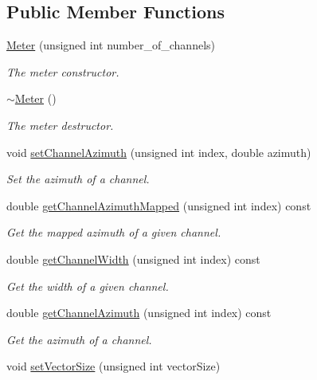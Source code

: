 \subsection*{Public Member Functions}
\begin{DoxyCompactItemize}
\item 
\hyperlink{class_hoa2_d_1_1_meter_ac2a73532fb2dc735d5c72886281b75e8}{Meter} (unsigned int number\-\_\-of\-\_\-channels)
\begin{DoxyCompactList}\small\item\em The meter constructor. \end{DoxyCompactList}\item 
\hyperlink{class_hoa2_d_1_1_meter_a48276da266f600f4d24db748ff4ca046}{$\sim$\-Meter} ()
\begin{DoxyCompactList}\small\item\em The meter destructor. \end{DoxyCompactList}\item 
void \hyperlink{class_hoa2_d_1_1_meter_a4170ee9ed709f6d6bfecd30591ac8347}{set\-Channel\-Azimuth} (unsigned int index, double azimuth)
\begin{DoxyCompactList}\small\item\em Set the azimuth of a channel. \end{DoxyCompactList}\item 
double \hyperlink{class_hoa2_d_1_1_meter_afeb35ed7f980219e9a0ef0a2b3474e42}{get\-Channel\-Azimuth\-Mapped} (unsigned int index) const 
\begin{DoxyCompactList}\small\item\em Get the mapped azimuth of a given channel. \end{DoxyCompactList}\item 
double \hyperlink{class_hoa2_d_1_1_meter_a10ccf98fe02151155c22644e7a61450a}{get\-Channel\-Width} (unsigned int index) const 
\begin{DoxyCompactList}\small\item\em Get the width of a given channel. \end{DoxyCompactList}\item 
double \hyperlink{class_hoa2_d_1_1_meter_a2f179adb5ec28fe4c2256c8333ea22ab}{get\-Channel\-Azimuth} (unsigned int index) const 
\begin{DoxyCompactList}\small\item\em Get the azimuth of a channel. \end{DoxyCompactList}\item 
void \hyperlink{class_hoa2_d_1_1_meter_ab3c720b0e9061f43218aff20a678aa9a}{set\-Vector\-Size} (unsigned int vector\-Size)

\end{DoxyCompactItemize}
